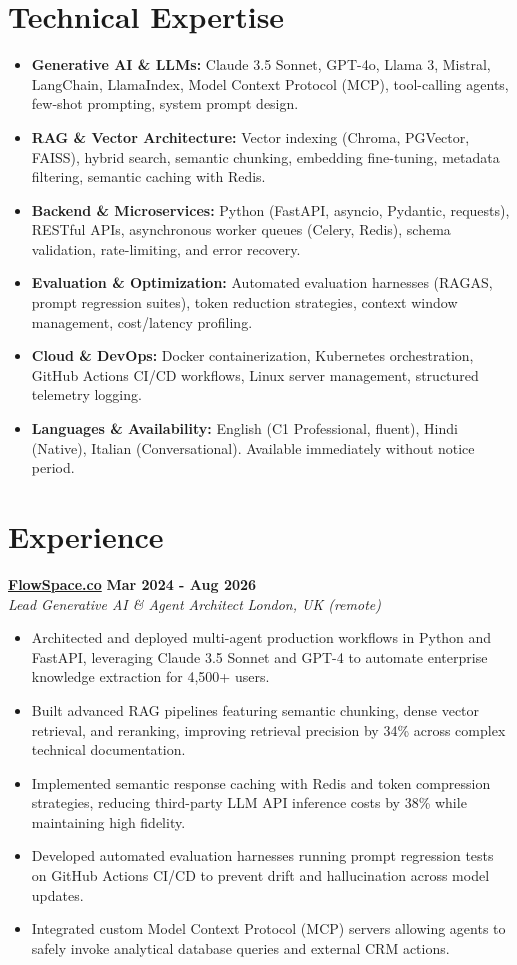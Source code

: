 \documentclass[10pt,a4paper]{article}
\newcommand{\role}[4]{%
  \textbf{#1} \hfill \textbf{#2}\\[1pt]%
  \textit{#3} \hfill \textit{#4}\\[2pt]%
}
\begin{document}
\section{Technical Expertise}
\begin{itemize}
  \item \textbf{Generative AI \& LLMs:} Claude 3.5 Sonnet, GPT-4o, Llama 3, Mistral, LangChain, LlamaIndex, Model Context Protocol (MCP), tool-calling agents, few-shot prompting, system prompt design.
  \item \textbf{RAG \& Vector Architecture:} Vector indexing (Chroma, PGVector, FAISS), hybrid search, semantic chunking, embedding fine-tuning, metadata filtering, semantic caching with Redis.
  \item \textbf{Backend \& Microservices:} Python (FastAPI, asyncio, Pydantic, requests), RESTful APIs, asynchronous worker queues (Celery, Redis), schema validation, rate-limiting, and error recovery.
  \item \textbf{Evaluation \& Optimization:} Automated evaluation harnesses (RAGAS, prompt regression suites), token reduction strategies, context window management, cost/latency profiling.
  \item \textbf{Cloud \& DevOps:} Docker containerization, Kubernetes orchestration, GitHub Actions CI/CD workflows, Linux server management, structured telemetry logging.
  \item \textbf{Languages \& Availability:} English (C1 Professional, fluent), Hindi (Native), Italian (Conversational). Available immediately without notice period.
\end{itemize}

\section{Experience}

\role{\href{https://flowspace.co}{FlowSpace.co}}{Mar 2024 - Aug 2026}{Lead Generative AI \& Agent Architect}{London, UK (remote)}
\begin{itemize}
  \item Architected and deployed multi-agent production workflows in Python and FastAPI, leveraging Claude 3.5 Sonnet and GPT-4 to automate enterprise knowledge extraction for 4,500+ users.
  \item Built advanced RAG pipelines featuring semantic chunking, dense vector retrieval, and reranking, improving retrieval precision by 34\% across complex technical documentation.
  \item Implemented semantic response caching with Redis and token compression strategies, reducing third-party LLM API inference costs by 38\% while maintaining high fidelity.
  \item Developed automated evaluation harnesses running prompt regression tests on GitHub Actions CI/CD to prevent drift and hallucination across model updates.
  \item Integrated custom Model Context Protocol (MCP) servers allowing agents to safely invoke analytical database queries and external CRM actions.
\end{itemize}
\end{document}
